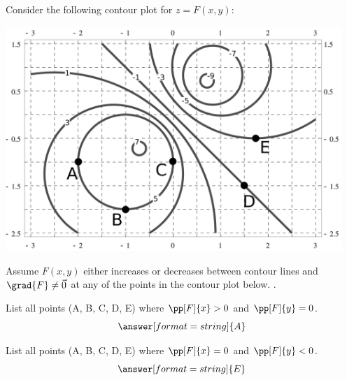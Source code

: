 \documentclass{ximera}
\author{Bart Snapp}
\begin{document}
\begin{exercise}
Consider the following contour plot for $z=F(x,y)$:
\begin{image}
\includegraphics[width=5in]{contours1.png}
\end{image}
Assume $F(x,y)$ either increases or decreases between contour lines and $\grad{F} \neq \vec{0}$ at any of the points in the contour plot below.
.

List all points (\textsf{A}, \textsf{B}, \textsf{C}, \textsf{D},
\textsf{E}) where $\pp[F]{x}>0$ and $\pp[F]{y}=0$.
\[
\answer[format=string]{A}
\]

  
List all points (\textsf{A}, \textsf{B}, \textsf{C}, \textsf{D},
\textsf{E}) where $\pp[F]{x}=0$ and $\pp[F]{y}<0$.
\[
\answer[format=string]{E}
\]
\end{exercise}
\end{document}
